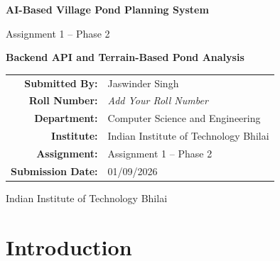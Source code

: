 \documentclass[12pt,a4paper]{article}
\begin{document}

\begin{titlepage}
    \centering
    
    \vspace*{1.5cm}
    
    {\Huge \textbf{AI-Based Village Pond Planning System}\par}
    
    \vspace{0.4cm}
    
    {\Large Assignment 1 -- Phase 2\par}
    
    \vspace{1.5cm}
    
    {\large \textbf{Backend API and Terrain-Based Pond Analysis}\par}
    
    \vfill
    
    \begin{tabular}{rl}
        \textbf{Submitted By:} & Jaswinder Singh \\
        \textbf{Roll Number:} & \textit{Add Your Roll Number} \\
        \textbf{Department:} & Computer Science and Engineering \\
        \textbf{Institute:} & Indian Institute of Technology Bhilai \\
        \textbf{Assignment:} & Assignment 1 -- Phase 2 \\
        \textbf{Submission Date:} & 01/09/2026 \\
    \end{tabular}
    
    \vfill
    
    {\large Indian Institute of Technology Bhilai\par}
    
\end{titlepage}


\tableofcontents
\newpage

\section{Introduction}
\end{document}
